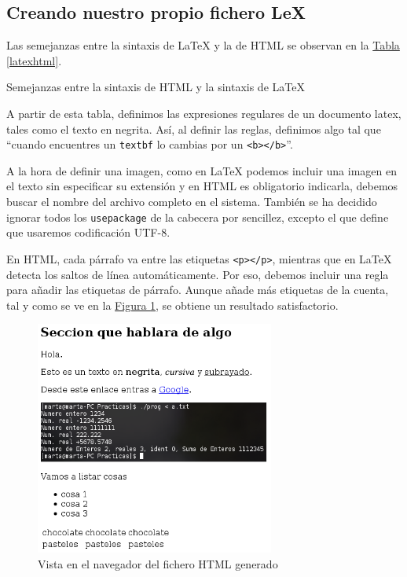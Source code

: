 \documentclass[10pt,a4paper,spanish]{report}
\begin{document}
\subsection{\textcolor{p5}Creando nuestro propio fichero LeX}
Las semejanzas entre la sintaxis de LaTeX y la de HTML se observan en la \hyperref[latexhtml]{Tabla \ref*{latexhtml}}.

\begin{table}[H]
\centering

\caption{Semejanzas entre la sintaxis de HTML y la sintaxis de LaTeX}
\label{latexhtml}
\end{table}

A partir de esta tabla, definimos las expresiones regulares de un documento latex, tales como el texto en negrita. Así, al definir las reglas, definimos algo tal que ``cuando encuentres un \texttt{textbf} lo cambias por un \texttt{<b></b>}''.

A la hora de definir una imagen, como en LaTeX podemos incluir una imagen en el texto sin especificar su extensión y en HTML es obligatorio indicarla, debemos buscar el nombre del archivo completo en el sistema. También se ha decidido ignorar todos los \texttt{usepackage} de la cabecera por sencillez, excepto el que define que usaremos codificación UTF-8.

En HTML, cada párrafo va entre las etiquetas \texttt{<p></p>}, mientras que en LaTeX detecta los saltos de línea automáticamente. Por eso, debemos incluir una regla para añadir las etiquetas de párrafo. Aunque añade más etiquetas de la cuenta, tal y como se ve en la \hyperref[pruebahtml]{Figura \ref*{pruebahtml}}, se obtiene un resultado satisfactorio.

\begin{figure}[!h]
\centering
\includegraphics[width=0.7\textwidth]{prueba}
\caption{Vista en el navegador del fichero HTML generado}
\label{pruebahtml}
\end{figure}
\end{document}
